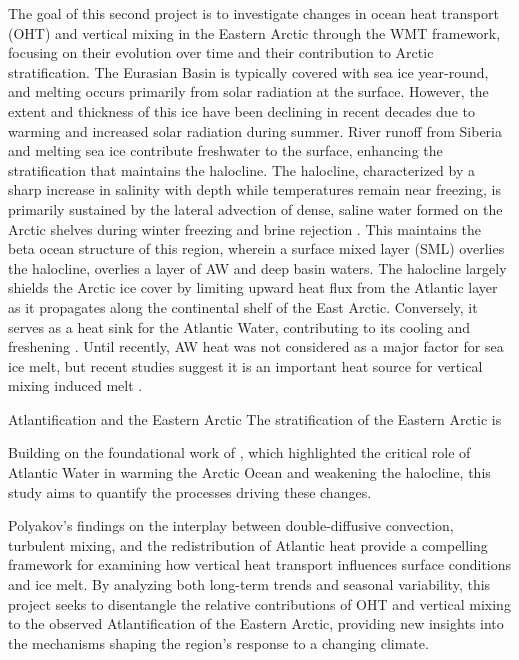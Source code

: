 \documentclass[draft]{agujournal2019}
\begin{document}
The goal of this second project is to investigate changes in ocean heat transport (OHT) and vertical mixing in the Eastern Arctic through the WMT framework, focusing on their evolution over time and their contribution to Arctic stratification. The Eurasian Basin is typically covered with sea ice year-round, and melting occurs primarily from solar radiation at the surface. However, the extent and thickness of this ice have been declining in recent decades due to warming and increased solar radiation during summer. River runoff from Siberia and melting sea ice contribute freshwater to the surface, enhancing the stratification that maintains the halocline. The halocline, characterized by a sharp increase in salinity with depth while temperatures remain near freezing, is primarily sustained by the lateral advection of dense, saline water formed on the Arctic shelves during winter freezing and brine rejection \cite{aagaard1981}. This maintains the beta ocean structure of this region, wherein a surface mixed layer (SML) overlies the halocline, overlies a layer of AW and deep basin waters. The halocline largely shields the Arctic ice cover by limiting upward heat flux from the Atlantic layer as it propagates along the continental shelf of the East Arctic. Conversely, it serves as a heat sink for the Atlantic Water, contributing to its cooling and freshening \cite{aagaard1981}. Until recently, AW heat was not considered as a major factor for sea ice melt, but recent studies suggest it is an important heat source for vertical mixing induced melt \cite{Carmack2007,Polyakov2017}.


Atlantification and the Eastern Arctic
The stratification of the Eastern Arctic is 

Building on the foundational work of
, which highlighted the critical role of Atlantic Water in warming the Arctic Ocean and weakening the halocline, this study aims to quantify the processes driving these changes. 

Polyakov's findings on the interplay between double-diffusive convection, turbulent mixing, and the redistribution of Atlantic heat provide a compelling framework for examining how vertical heat transport influences surface conditions and ice melt. By analyzing both long-term trends and seasonal variability, this project seeks to disentangle the relative contributions of OHT and vertical mixing to the observed Atlantification of the Eastern Arctic, providing new insights into the mechanisms shaping the region's response to a changing climate.
\end{document}

